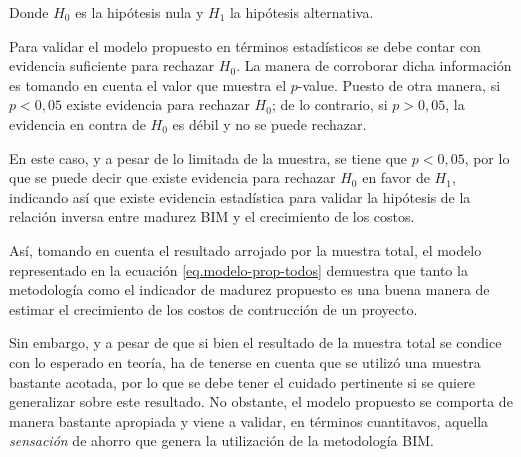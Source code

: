 Donde $H_0$ es la hipótesis nula y $H_1$ la hipótesis alternativa. 

Para validar el modelo propuesto en términos estadísticos se debe contar con evidencia suficiente para rechazar $H_0$. La manera de corroborar dicha información es tomando en cuenta el valor que muestra el $p$-value. Puesto de otra manera, si $p<0,05$ existe evidencia para rechazar $H_0$; de lo contrario, si $p>0,05$, la evidencia en contra de $H_0$ es débil y no se puede rechazar. 

En este caso, y a pesar de lo limitada de la muestra, se tiene que $p<0,05$, por lo que se puede decir que existe evidencia para rechazar $H_0$ en favor de $H_1$, indicando así que existe evidencia estadística para validar la hipótesis de la relación inversa entre madurez BIM y el crecimiento de los costos.

Así, tomando en cuenta el resultado arrojado por la muestra total, el modelo representado en la ecuación \eqref{eq.modelo-prop-todos} demuestra que tanto la metodología como el indicador de madurez propuesto es una buena manera de estimar el crecimiento de los costos de contrucción de un proyecto. 

Sin embargo, y a pesar de que si bien el resultado de la muestra total se condice con lo esperado en teoría, ha de tenerse en cuenta que se utilizó una muestra bastante acotada, por lo que se debe tener el cuidado pertinente si se quiere generalizar sobre este resultado. No obstante, el modelo propuesto se comporta de manera bastante apropiada y viene a validar, en términos cuantitavos, aquella \emph{sensación} de ahorro que genera la utilización de la metodología BIM.